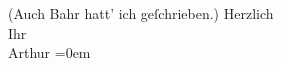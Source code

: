 \begin{ledgroupsized}[t]{13cm}
               (Auch Bahr hatt’ ich geſchrieben.)\pend
           \pstart
           {\pb}Herzlich{\\[\baselineskip]}Ihr{\\[\baselineskip]}\spacefill\mbox{Arthur}\pend
           \leftskip=0em{}\endnumbering{}\end{ledgroupsized}  \newcommand{\dateiname}{L01395}\newcommand{\titel}{Arthur Schnitzler an Richard Beer-Hofmann, 26. 4. 1904}\newcommand{\editorInnen}{Martin Anton Müller und Gerd-Hermann Susen}
            \footnotesize
\begin{ledgroupsized}[t]{11.5cm}
\end{ledgroupsized}
         
      